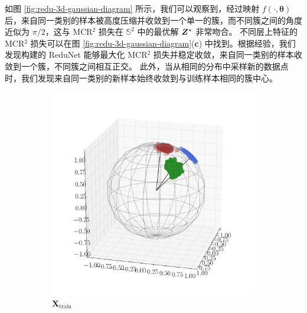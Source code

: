 \documentclass[../../book-main.tex]{subfiles}
\begin{document}
\begin{example}
如图 \ref{fig:redu-3d-gaussian-diagram} 所示，我们可以观察到，经过映射 $f(\cdot, \bm{\theta})$ 后，来自同一类别的样本被高度压缩并收敛到一个单一的簇，而不同簇之间的角度近似为 $\pi/2$，这与 MCR$^2$ 损失在 $\mathbb{S}^2$ 中的最优解 $\bm{Z}^{\star}$ 非常吻合。
不同层上特征的 MCR$^2$ 损失可以在图 \ref{fig:redu-3d-gaussian-diagram}(\textbf{c}) 中找到。根据经验，我们发现构建的 ReduNet 能够最大化 MCR$^2$ 损失并稳定收敛，来自同一类别的样本收敛到一个簇，不同簇之间相互正交。
此外，当从相同的分布中采样新的数据点时，我们发现来自同一类别的新样本始终收敛到与训练样本相同的簇中心。
\begin{figure}[t]
    \begin{subfigure}[t]{0.32\textwidth}
        \centering
        \includegraphics[width=\textwidth]{figs_chap4/scatter3d-X_train.pdf}\vspace{-0.1in}
        \caption{$\bm{X}_{\text{train}}$}
    \end{subfigure}
    \hfill
    \begin{subfigure}[t]{0.32\textwidth}
        \centering

\end{subfigure}
\end{figure}
\end{example}
\end{document}

